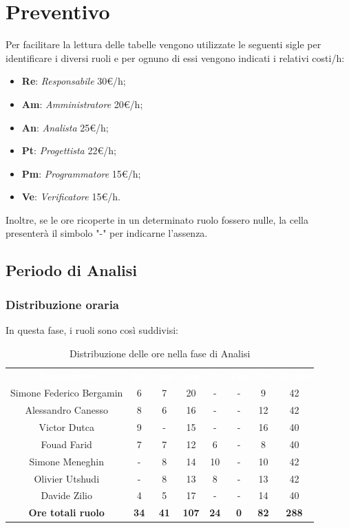 \section{Preventivo}
Per facilitare la lettura delle tabelle vengono utilizzate le seguenti sigle per identificare i diversi ruoli e per ognuno di essi vengono indicati i relativi costi/h: \begin{itemize}
\item \textbf{Re}: \textit{Responsabile} 30€/h;
\item \textbf{Am}: \textit{Amministratore} 20€/h;
\item \textbf{An}: \textit{Analista} 25€/h;
\item \textbf{Pt}: \textit{Progettista} 22€/h;
\item \textbf{Pm}: \textit{Programmatore} 15€/h;
\item \textbf{Ve}: \textit{Verificatore} 15€/h.
\end{itemize}
Inoltre, se le ore ricoperte in un determinato ruolo fossero nulle, la cella presenterà il simbolo "-" per indicarne l'assenza.
 
\subsection{Periodo di Analisi}
\subsubsection{Distribuzione oraria}
In questa fase, i ruoli sono così suddivisi:
\begin{table}[H]
\centering\renewcommand{\arraystretch}{1.5}
\caption{Distribuzione delle ore nella fase di Analisi}
\vspace{0.2cm}
\begin{tabular}{ c c c c c c c c }
\rowcolor{redafk}
\textcolor{white}{\textbf{Nominativo}} & \textcolor{white}{\textbf{Re}} &
\textcolor{white}{\textbf{Am}} & \textcolor{white}{\textbf{An}} &
\textcolor{white}{\textbf{Pt}} & \textcolor{white}{\textbf{Pm}} &
\textcolor{white}{\textbf{Ve}} & \textcolor{white}{\textbf{Totale}} \\
Simone Federico Bergamin & 6 & 7 & 20 & - & - & 9 & 42 \\
Alessandro Canesso & 8 & 6 & 16 & - & - & 12 & 42 \\
Victor Dutca & 9 & - & 15 & - & - & 16 & 40 \\
Fouad Farid & 7 & 7 & 12 & 6 & - & 8 & 40 \\
Simone Meneghin & - & 8 & 14 & 10 & - & 10 & 42 \\
Olivier Utshudi & - & 8 & 13 & 8 & - & 13 & 42 \\
Davide Zilio & 4 & 5 & 17 & - & - & 14 & 40 \\
\rowcolor{lastrowcolor}
\textbf{Ore totali ruolo} & \textbf{34} & \textbf{41} & \textbf{107} & \textbf{24} & \textbf{0} & \textbf{82} & \textbf{288} \\
\end{tabular}
\end{table}
 
